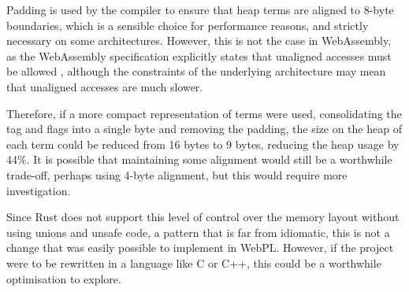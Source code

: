 Padding is used by the compiler to ensure that heap terms are aligned to 8-byte boundaries, which is a sensible choice for performance reasons, and strictly necessary on some architectures. However, this is not the case in WebAssembly, as the WebAssembly specification explicitly states that unaligned accesses must be allowed \cite{rossbergWebAssemblyCoreSpecification2022}, although the constraints of the underlying architecture may mean that unaligned accesses are much slower.

Therefore, if a more compact representation of terms were used, consolidating the tag and flags into a single byte and removing the padding, the size on the heap of each term could be reduced from 16 bytes to 9 bytes, reducing the heap usage by 44\%. It is possible that maintaining some alignment would still be a worthwhile trade-off, perhaps using 4-byte alignment, but this would require more investigation.

Since Rust does not support this level of control over the memory layout without using unions and unsafe code, a pattern that is far from idiomatic, this is not a change that was easily possible to implement in WebPL. However, if the project were to be rewritten in a language like C or C++, this could be a worthwhile optimisation to explore.